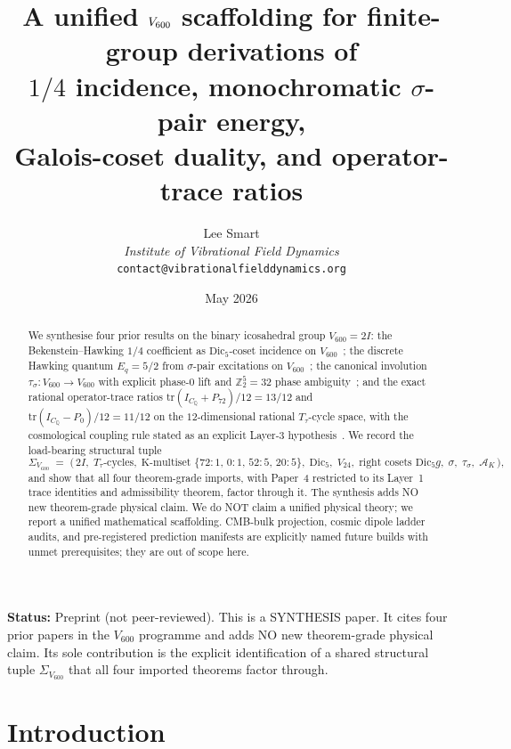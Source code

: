 \documentclass[11pt]{article}
\title{A unified $\Vsixhundred$ scaffolding for finite-group derivations of\\
       $1/4$ incidence, monochromatic $\sigma$-pair energy,\\
       Galois-coset duality, and operator-trace ratios}
\author{%
  Lee Smart \\[3pt]
  \textit{Institute of Vibrational Field Dynamics} \\[2pt]
  \texttt{contact@vibrationalfielddynamics.org}}
\date{May 2026}
\theoremstyle{remark}
\newcommand{\twoI}{2I}
\newcommand{\Vsixhundred}{V_{600}}
\newcommand{\Dicfive}{\mathrm{Dic}_5}
\newcommand{\Vtwentyfour}{V_{24}}
\newcommand{\Sigmaspine}{\Sigma_{\Vsixhundred}}
\newcommand{\CQ}{C_{\mathbb{Q}}}
\newcommand{\Ttau}{T_{\tau}}
\newcommand{\sigmaG}{\sigma}
\newcommand{\tausigma}{\tau_\sigma}
\newcommand{\AK}{\mathcal{A}_K}
\newcommand{\PK}[1]{P_{#1}}
\begin{document}
\maketitle

\noindent\textbf{Status:} Preprint (not peer-reviewed).
This is a SYNTHESIS paper. It cites four prior papers in the
$\Vsixhundred$ programme and adds NO new theorem-grade physical
claim. Its sole contribution is the explicit identification of a
shared structural tuple $\Sigmaspine$ that all four imported
theorems factor through.

\begin{abstract}
We synthesise four prior results on the binary icosahedral group
$\Vsixhundred = \twoI$:
the Bekenstein--Hawking $1/4$ coefficient as $\Dicfive$-coset
incidence on $\Vsixhundred$~\citep{V600Paper1};
the discrete Hawking quantum $E_q = 5/2$ from $\sigmaG$-pair
excitations on $\Vsixhundred$~\citep{V600Paper2};
the canonical involution $\tausigma : \Vsixhundred \to \Vsixhundred$
with explicit phase-$0$ lift and $\mathbb{Z}_2^5 = 32$ phase
ambiguity~\citep{V600Paper3};
and the exact rational operator-trace ratios
$\mathrm{tr}(I_{\CQ} + \PK{72})/12 = 13/12$ and
$\mathrm{tr}(I_{\CQ} - \PK{0})/12 = 11/12$ on the
$12$-dimensional rational $\Ttau$-cycle space, with the
cosmological coupling rule stated as an explicit Layer-3
hypothesis~\citep{V600Paper4}.
We record the load-bearing structural tuple
\[
  \Sigmaspine \;=\; \bigl(\,\twoI,\; \Ttau\text{-cycles},\;
  \text{K-multiset } \{72{:}1,\,0{:}1,\,52{:}5,\,20{:}5\},\;
  \Dicfive,\; \Vtwentyfour,\;
  \text{right cosets } \Dicfive g,\;
  \sigmaG,\; \tausigma,\; \AK\,\bigr),
\]
and show that all four theorem-grade imports, with Paper~4
restricted to its Layer~1 trace identities and admissibility
theorem, factor through it.
The synthesis adds NO new theorem-grade physical claim. We do NOT
claim a unified physical theory; we report a unified mathematical
scaffolding. CMB-bulk projection, cosmic dipole ladder audits, and
pre-registered prediction manifests are explicitly named future
builds with unmet prerequisites; they are out of scope here.
\end{abstract}

\section{Introduction}\label{sec:intro}
\end{document}
